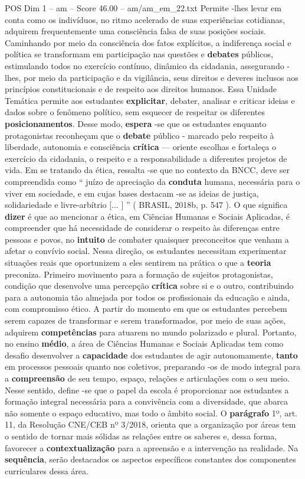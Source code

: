 \begin{textsample}{POS Dim 1 – am – Score 46.00 – am/am\_em\_22.txt}
Permite -lhes levar em conta como os indivíduos, no ritmo acelerado de suas experiências cotidianas, adquirem frequentemente uma consciência falsa de suas posições sociais.
Caminhando por meio da consciência dos fatos explícitos, a indiferença social e política se transformam em participação nas questões e \textbf{debates} públicos, estimulando todos no exercício contínuo, dinâmico da cidadania, assegurando -lhes, por meio da participação e da vigilância, seus direitos e deveres inclusos aos princípios constitucionais e de respeito aos direitos humanos.
Essa Unidade Temática permite aos estudantes \textbf{explicitar}, debater, analisar e criticar ideias e dados sobre o fenômeno político, sem esquecer de respeitar os diferentes \textbf{posicionamentos}.
Desse modo, \textbf{espera} -se que os estudantes enquanto protagonistas reconheçam que o \textbf{debate} público - marcado pelo respeito à liberdade, autonomia e consciência \textbf{crítica} — oriente escolhas e fortaleça o exercício da cidadania, o respeito e a responsabilidade a diferentes projetos de vida.
Em se tratando da ética, ressalta -se que no contexto da BNCC, deve ser compreendida como “ juízo de apreciação da \textbf{conduta} humana, necessária para o viver em sociedade, e em cujas bases destacam -se as ideias de justiça, solidariedade e livre-arbítrio [... ] ” ( BRASIL, 2018b, p. 547 ).
O que significa \textbf{dizer} é que ao mencionar a ética, em Ciências Humanas e Sociais Aplicadas, é compreender que há necessidade de considerar o respeito às diferenças entre pessoas e povos, no \textbf{intuito} de combater quaisquer preconceitos que venham a afetar o convívio social.
Nessa direção, os estudantes necessitam experimentar situações reais que oportunizem a eles sentirem na prática o que a \textbf{teoria} preconiza.
Primeiro movimento para a formação de sujeitos protagonistas, condição que desenvolve uma percepção \textbf{crítica} sobre si e o outro, contribuindo para a autonomia tão almejada por todos os profissionais da educação e ainda, com compromisso ético.
A partir do momento em que os estudantes percebem serem capazes de transformar e serem transformados, por meio de suas ações, adquirem \textbf{competências} para atuarem no mundo polarizado e plural.
Portanto, no ensino \textbf{médio}, a área de Ciências Humanas e Sociais Aplicadas tem como desafio desenvolver a \textbf{capacidade} dos estudantes de agir autonomamente, \textbf{tanto} em processos pessoais quanto nos coletivos, preparando -os de modo integral para a \textbf{compreensão} de seu tempo, espaço, relações e articulações com o seu meio.
Nesse sentido, define -se que o papel da escola é proporcionar aos estudantes a formação integral necessária para a convivência com a diversidade, que abarca não somente o espaço educativo, mas todo o âmbito social.
O \textbf{parágrafo} 1º, art. 11, da Resolução CNE/CEB nº 3/2018, orienta que a organização por áreas tem o sentido de tornar mais sólidas as relações entre os saberes e, dessa forma, favorecer a \textbf{contextualização} para a apreensão e a intervenção na realidade.
Na \textbf{sequência}, serão destacados os aspectos específicos constantes dos componentes curriculares dessa área.


\end{textsample}
